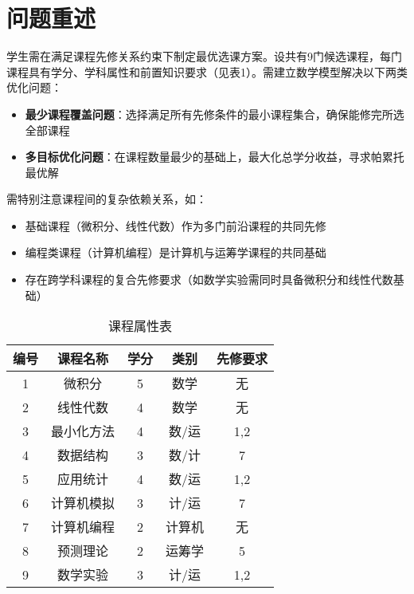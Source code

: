 \section{问题重述}
学生需在满足课程先修关系约束下制定最优选课方案。设共有9门候选课程，每门课程具有学分、学科属性和前置知识要求（见表1）。需建立数学模型解决以下两类优化问题：

\begin{itemize}
    \item \textbf{最少课程覆盖问题}：选择满足所有先修条件的最小课程集合，确保能修完所选全部课程
    \item \textbf{多目标优化问题}：在课程数量最少的基础上，最大化总学分收益，寻求帕累托最优解
\end{itemize}

需特别注意课程间的复杂依赖关系，如：
\begin{itemize}
    \item 基础课程（微积分、线性代数）作为多门前沿课程的共同先修
    \item 编程类课程（计算机编程）是计算机与运筹学课程的共同基础
    \item 存在跨学科课程的复合先修要求（如数学实验需同时具备微积分和线性代数基础）
\end{itemize}

\begin{table}[htbp]
\centering
\caption{课程属性表}
\label{tab:course}
\begin{tabular}{ccccc}
\toprule
编号 & 课程名称 & 学分 & 类别 & 先修要求 \\
\midrule
1 & 微积分 & 5 & 数学 & 无 \\
2 & 线性代数 & 4 & 数学 & 无 \\
3 & 最小化方法 & 4 & 数/运 & 1,2 \\
4 & 数据结构 & 3 & 数/计 & 7 \\
5 & 应用统计 & 4 & 数/运 & 1,2 \\
6 & 计算机模拟 & 3 & 计/运 & 7 \\
7 & 计算机编程 & 2 & 计算机 & 无 \\
8 & 预测理论 & 2 & 运筹学 & 5 \\
9 & 数学实验 & 3 & 计/运 & 1,2 \\
\bottomrule
\end{tabular}
\end{table}
